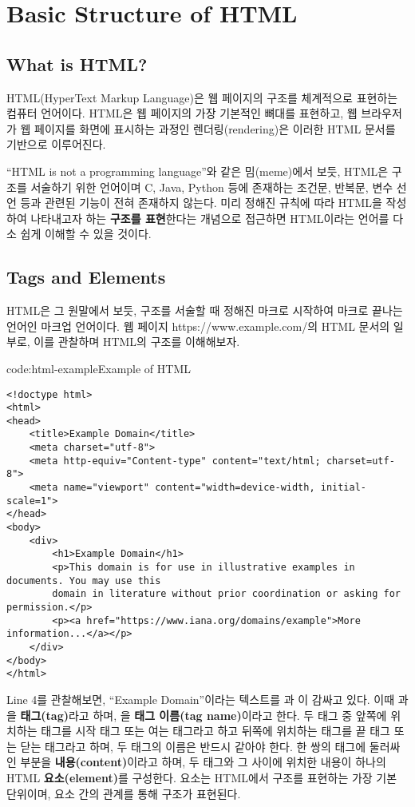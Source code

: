 \section{Basic Structure of HTML}\label{sect:basic-structure-of-html}

\subsection*{What is HTML?}

HTML(HyperText Markup Language)은 웹 페이지의 구조를 체계적으로 표현하는 컴퓨터 언어이다. HTML은 웹 페이지의 가장 기본적인 뼈대를 표현하고, 웹 브라우저가 웹 페이지를 화면에 표시하는 과정인 렌더링(rendering)은 이러한 HTML 문서를 기반으로 이루어진다.

``HTML is not a programming language''와 같은 밈(meme)에서 보듯, HTML은 구조를 서술하기 위한 언어이며 C, Java, Python 등에 존재하는 조건문, 반복문, 변수 선언 등과 관련된 기능이 전혀 존재하지 않는다. 미리 정해진 규칙에 따라 HTML을 작성하여 나타내고자 하는 \textbf{구조를 표현}한다는 개념으로 접근하면 HTML이라는 언어를 다소 쉽게 이해할 수 있을 것이다.

\subsection*{Tags and Elements}
HTML은 그 원말에서 보듯, 구조를 서술할 때 정해진 마크로 시작하여 마크로 끝나는 언어인 마크업 언어이다. \은 웹 페이지 https://www.example.com/의 HTML 문서의 일부로, 이를 관찰하며 HTML의 구조를 이해해보자. 

\begin{codeenv}{code:html-example}{Example of HTML}\begin{verbatim}
<!doctype html>
<html>
<head>
    <title>Example Domain</title>
    <meta charset="utf-8">
    <meta http-equiv="Content-type" content="text/html; charset=utf-8">
    <meta name="viewport" content="width=device-width, initial-scale=1">
</head>
<body>
    <div>
        <h1>Example Domain</h1>
        <p>This domain is for use in illustrative examples in documents. You may use this
        domain in literature without prior coordination or asking for permission.</p>
        <p><a href="https://www.iana.org/domains/example">More information...</a></p>
    </div>
</body>
</html>
\end{verbatim}
\end{codeenv}

Line 4를 관찰해보면, ``Example Domain''이라는 텍스트를 과 이 감싸고 있다. 이때 과 을 \textbf{태그(tag)}라고 하며, 을 \textbf{태그 이름(tag name)}이라고 한다. 두 태그 중 앞쪽에 위치하는 태그를 시작 태그 또는 여는 태그라고 하고 뒤쪽에 위치하는 태그를 끝 태그 또는 닫는 태그라고 하며, 두 태그의 이름은 반드시 같아야 한다. 한 쌍의 태그에 둘러싸인 부분을 \textbf{내용(content)}이라고 하며, 두 태그와 그 사이에 위치한 내용이 하나의 HTML \textbf{요소(element)}를 구성한다. 요소는 HTML에서 구조를 표현하는 가장 기본 단위이며, 요소 간의 관계를 통해 구조가 표현된다.

